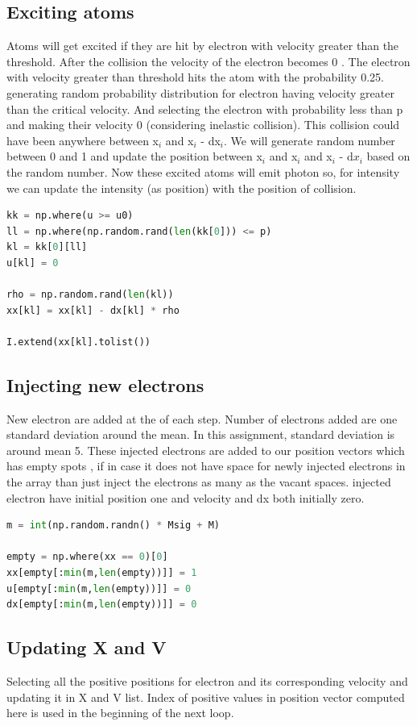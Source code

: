 \documentclass[a4paper]{article}
\begin{document}
\subsection{Exciting atoms}
Atoms will get excited if they are hit by electron with velocity greater than the threshold. After the collision the velocity of the electron becomes 0 . The electron with velocity greater than threshold hits the atom with the probability 0.25. generating random probability distribution for electron having velocity greater than the critical velocity. And selecting the electron with probability less than p and making their velocity 0 (considering inelastic collision). 
This collision could have been anywhere between x$_{i}$ and x$_{i}$ - dx$_{i}$. We will generate random number between 0 and 1 and update the position between x$_{i}$ and x$_{i}$ and x$_{i}$ - d$x_{i}$  based on the random number.
Now these excited atoms will emit photon so, for intensity we can update the intensity (as position) with the position of collision.
\begin{lstlisting}[language=Python]
kk = np.where(u >= u0)
ll = np.where(np.random.rand(len(kk[0])) <= p)
kl = kk[0][ll]
u[kl] = 0

rho = np.random.rand(len(kl))
xx[kl] = xx[kl] - dx[kl] * rho

I.extend(xx[kl].tolist())
\end{lstlisting}
\subsection{Injecting new electrons}
New electron are added at the of each step.
Number of electrons added are one standard deviation around the mean. In this assignment, standard deviation is around mean 5.
These injected electrons are added to our position vectors which has empty spots , if in case it does not have space for newly injected electrons in the array than just inject the electrons as many as the vacant spaces. injected electron have initial position one and velocity and dx both initially zero.
\begin{lstlisting}[language=Python]
m = int(np.random.randn() * Msig + M)

empty = np.where(xx == 0)[0]
xx[empty[:min(m,len(empty))]] = 1
u[empty[:min(m,len(empty))]] = 0
dx[empty[:min(m,len(empty))]] = 0
\end{lstlisting}

\subsection{Updating X and V}
Selecting all the positive positions for electron and its corresponding velocity and updating it in X and V list. Index of positive values in position vector computed here is used in the beginning of the next loop. 
\end{document}
